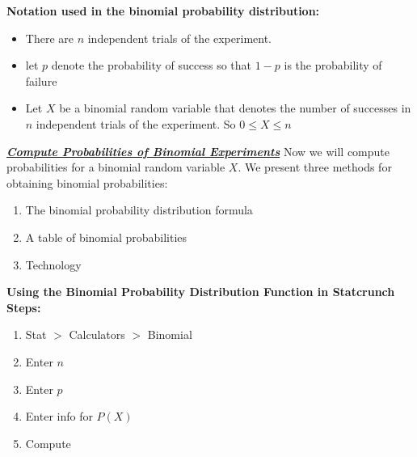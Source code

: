 \documentclass{report}
\begin{document}
      \bigbreak \noindent \bigbreak \noindent 
      \textbf{Notation used in the binomial probability distribution:}
      \begin{itemize}
          \item There are $n $ independent trials of the experiment.
        \item let $p $ denote the probability of success so that $1-p $ is the probability of failure
        \item Let $X $ be a binomial random variable that denotes the number of successes in $n $ independent trials of the experiment. So $0 \leq X \leq n $
      \end{itemize}

      \bigbreak \noindent \bigbreak \noindent 
      \textbf{\textit{\underline{Compute Probabilities of Binomial Experiments}}}
      \bigbreak \noindent 
      Now we will compute probabilities for a binomial random variable $X$. We present three methods for obtaining binomial probabilities:
      \bigbreak \noindent 
      \begin{enumerate}
          \item The binomial probability distribution formula
          \item A table of binomial probabilities
          \item Technology
      \end{enumerate}
      \bigbreak \noindent 

      \bigbreak \noindent \bigbreak \noindent 
      \textbf{Using the Binomial Probability Distribution Function in Statcrunch}
      \bigbreak \noindent 
      \textbf{Steps:}
      \begin{enumerate}
          \item Stat $> $ Calculators $> $ Binomial
        \item Enter $n $
        \item Enter $p $
        \item Enter info for $P(X)$
        \item Compute
      \end{enumerate}
\end{document}
